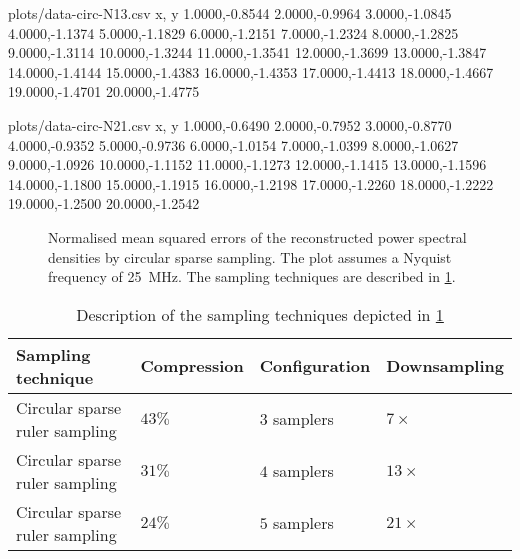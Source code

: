 \documentclass[a4paper, openany, oneside]{memoir}
\begin{document}
\begin{filecontents*}{plots/data-circ-N13.csv}
x, y
1.0000,-0.8544
2.0000,-0.9964
3.0000,-1.0845
4.0000,-1.1374
5.0000,-1.1829
6.0000,-1.2151
7.0000,-1.2324
8.0000,-1.2825
9.0000,-1.3114
10.0000,-1.3244
11.0000,-1.3541
12.0000,-1.3699
13.0000,-1.3847
14.0000,-1.4144
15.0000,-1.4383
16.0000,-1.4353
17.0000,-1.4413
18.0000,-1.4667
19.0000,-1.4701
20.0000,-1.4775
\end{filecontents*}

\begin{filecontents*}{plots/data-circ-N21.csv}
x, y
1.0000,-0.6490
2.0000,-0.7952
3.0000,-0.8770
4.0000,-0.9352
5.0000,-0.9736
6.0000,-1.0154
7.0000,-1.0399
8.0000,-1.0627
9.0000,-1.0926
10.0000,-1.1152
11.0000,-1.1273
12.0000,-1.1415
13.0000,-1.1596
14.0000,-1.1800
15.0000,-1.1915
16.0000,-1.2198
17.0000,-1.2260
18.0000,-1.2222
19.0000,-1.2500
20.0000,-1.2542
\end{filecontents*}

\begin{figure}
	\centering
	\caption{Normalised mean squared errors of the reconstructed power spectral densities by circular sparse sampling. The plot assumes a Nyquist frequency of \SI{25}{MHz}. The sampling techniques are described in \cref{tab:sampling-nmse-circ}.}
	\label{fig:plot-nmse-circ}
\end{figure}

\begin{table}
	\centering
	\begin{tabular}{llll}
		\textbf{Sampling technique} & \textbf{Compression} & \textbf{Configuration} & \textbf{Downsampling} \\ \hline
		Circular sparse ruler sampling & $43\%$ & $3$ samplers & $7 \times$ \\
		Circular sparse ruler sampling & $31\%$ & $4$ samplers & $13 \times$ \\
		Circular sparse ruler sampling & $24\%$ & $5$ samplers & $21 \times$ \\
	\end{tabular}
	\caption{Description of the sampling techniques depicted in \cref{fig:plot-nmse-circ}}
	\label{tab:sampling-nmse-circ}
\end{table}
\end{document}
